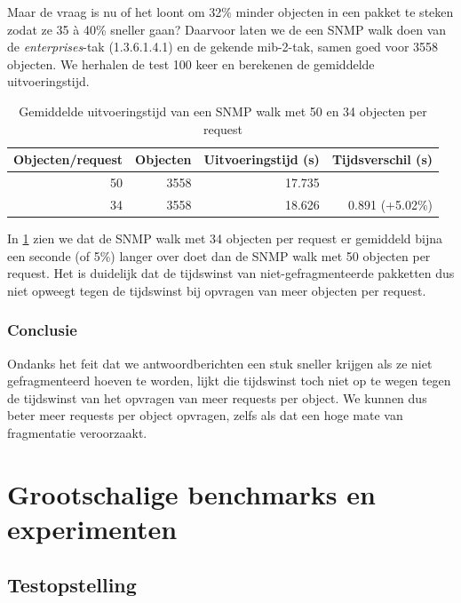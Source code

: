 Maar de vraag is nu of het loont om 32\% minder objecten in een pakket te steken zodat ze 35 à 40\% sneller gaan?
Daarvoor laten we de \nwmretriever{} een SNMP walk doen van de \textit{enterprises}-tak (1.3.6.1.4.1) en de gekende mib-2-tak, samen goed voor 3558 objecten.
We herhalen de test 100 keer en berekenen de gemiddelde uitvoeringstijd.

\begin{table}[h]
\centering
\begin{tabular}{@{}rrrr@{}}
\toprule
Objecten/request & Objecten & Uitvoeringstijd (s) & Tijdsverschil (s) \\ \midrule
50               & 3558     & 17.735              &                   \\
34               & 3558     & 18.626              & 0.891 (+5.02\%)   \\ \bottomrule
\end{tabular}
\caption{Gemiddelde uitvoeringstijd van een SNMP walk met 50 en 34 objecten per request}
\label{tabel-fragmentatie-uitvoeringstijd}
\end{table}

In \cref{tabel-fragmentatie-uitvoeringstijd} zien we dat de SNMP walk met 34 objecten per request er gemiddeld bijna een seconde (of 5\%) langer over doet
dan de SNMP walk met 50 objecten per request.
Het is duidelijk dat de tijdswinst van niet-gefragmenteerde pakketten dus niet opweegt tegen de tijdswinst bij opvragen van meer objecten per request.

\subsubsection{Conclusie}

Ondanks het feit dat we antwoordberichten een stuk sneller krijgen als ze niet gefragmenteerd hoeven te worden,
lijkt die tijdswinst toch niet op te wegen tegen de tijdswinst van het opvragen van meer requests per object.
We kunnen dus beter meer requests per object opvragen, zelfs als dat een hoge mate van fragmentatie veroorzaakt.


\section{Grootschalige benchmarks en experimenten}

\subsection{Testopstelling}

